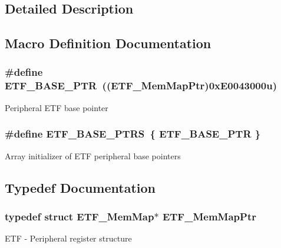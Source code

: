 \subsection{Detailed Description}


\subsection{Macro Definition Documentation}
\hypertarget{group___e_t_f___peripheral_ga46da3f879a5311a0651d7908021daa5e}{}
\subsubsection[{E\+T\+F\+\_\+\+B\+A\+S\+E\+\_\+\+P\+T\+R}]{\setlength{\rightskip}{0pt plus 5cm}\#define E\+T\+F\+\_\+\+B\+A\+S\+E\+\_\+\+P\+T\+R~(({\bf E\+T\+F\+\_\+\+Mem\+Map\+Ptr})0x\+E0043000u)}\label{group___e_t_f___peripheral_ga46da3f879a5311a0651d7908021daa5e}
Peripheral E\+T\+F base pointer \hypertarget{group___e_t_f___peripheral_ga9b5fbcfe81b6b5df44eca49c314c4806}{}
\subsubsection[{E\+T\+F\+\_\+\+B\+A\+S\+E\+\_\+\+P\+T\+R\+S}]{\setlength{\rightskip}{0pt plus 5cm}\#define E\+T\+F\+\_\+\+B\+A\+S\+E\+\_\+\+P\+T\+R\+S~\{ {\bf E\+T\+F\+\_\+\+B\+A\+S\+E\+\_\+\+P\+T\+R} \}}\label{group___e_t_f___peripheral_ga9b5fbcfe81b6b5df44eca49c314c4806}
Array initializer of E\+T\+F peripheral base pointers 

\subsection{Typedef Documentation}
\hypertarget{group___e_t_f___peripheral_ga3b20bc884bec4b23870d47a4e2f9a118}{}
\subsubsection[{E\+T\+F\+\_\+\+Mem\+Map\+Ptr}]{\setlength{\rightskip}{0pt plus 5cm}typedef struct {\bf E\+T\+F\+\_\+\+Mem\+Map}$\ast$ {\bf E\+T\+F\+\_\+\+Mem\+Map\+Ptr}}\label{group___e_t_f___peripheral_ga3b20bc884bec4b23870d47a4e2f9a118}
E\+T\+F -\/ Peripheral register structure 